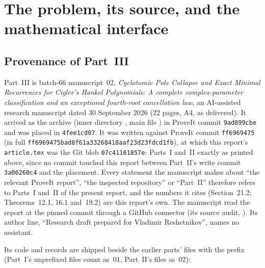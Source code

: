 \documentclass[11pt]{article}
\theoremstyle{definition}
\theoremstyle{remark}
\newcommand{\pinIII}{ff6969475bad8f61a33268418aaf23d23fdcd1fb}
\theoremstyle{definition}
\theoremstyle{plain}
\numberwithin{equation}{section}
\begin{document}
\section{The problem, its source, and the mathematical interface}
\label{cp:sec:introduction}

\subsection{Provenance of Part~III}
\label{cp:sec:merge-provenance}
Part~III is batch-66 manuscript~02, \emph{Cyclotomic Pole Collapse and Exact
Minimal Recurrences for Cigler's Hankel Polynomials: A complete
complex-parameter classification and an exceptional fourth-root
cancellation law}, an AI-assisted research manuscript dated
30 September 2026 (22 pages, A4, as delivered). It arrived as the archive
 (inner directory
, main file ) in
ProveIt commit \texttt{9ad899cbe} and was placed in \texttt{4fee1cd07}. It
was written against ProveIt commit \texttt{ff6969475} (in full
\texttt{\pinIII}), at which this report's \texttt{article.tex} was the Git
blob \texttt{07c41161857e}: Parts~I and~II exactly as printed above, since
no commit touched this report between Part~II's write commit
\texttt{3a06260c4} and the placement. Every statement the manuscript makes
about ``the relevant ProveIt report'', ``the inspected repository'' or
``Part~II'' therefore refers to Parts~I and~II of the present report, and
the numbers it cites (Section~21.2; Theorems~12.1, 16.1 and~19.2) are this
report's own. The manuscript read the report at the pinned commit through a
GitHub connector (its source audit,
). Its author line,
``Research draft prepared for Vladimir Reshetnikov'', names no assistant.

Its code and records are shipped beside the earlier parts' files with the
prefix  (Part~I's unprefixed files count as~01,
Part~II's  files as~02):
\end{document}
